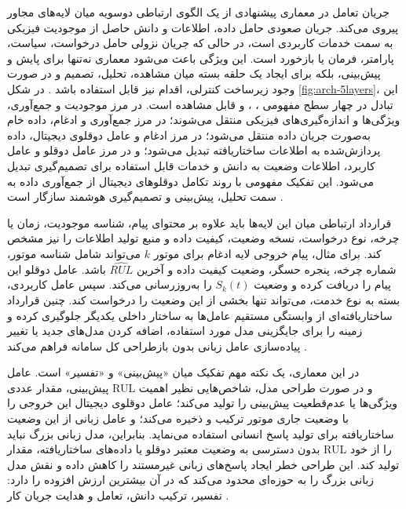 جریان تعامل در معماری پیشنهادی از یک الگوی ارتباطی دوسویه میان لایه‌های مجاور پیروی می‌کند. جریان صعودی حامل داده، اطلاعات و دانش حاصل از موجودیت فیزیکی به سمت خدمات کاربردی است، در حالی که جریان نزولی حامل درخواست، سیاست، پارامتر، فرمان یا بازخورد است. این ویژگی باعث می‌شود معماری نه‌تنها برای پایش و پیش‌بینی، بلکه برای ایجاد یک حلقه بسته میان مشاهده، تحلیل، تصمیم و در صورت وجود زیرساخت کنترلی، اقدام نیز قابل استفاده باشد \cite{tao2019digital,qi2021enabling}. در شکل \ref{fig:arch-5layers}، این تبادل در چهار سطح مفهومی ، ،  و  قابل مشاهده است. در مرز موجودیت و جمع‌آوری، ویژگی‌ها و اندازه‌گیری‌های فیزیکی منتقل می‌شوند؛ در مرز جمع‌آوری و ادغام، داده خام به‌صورت جریان داده منتقل می‌شود؛ در مرز ادغام و عامل دوقلوی دیجیتال، داده پردازش‌شده به اطلاعات ساختاریافته تبدیل می‌شود؛ و در مرز عامل دوقلو و عامل کاربرد، اطلاعات وضعیت به دانش و خدمات قابل استفاده برای تصمیم‌گیری تبدیل می‌شود. این تفکیک مفهومی با روند تکامل دوقلو‌های دیجیتال از جمع‌آوری داده به سمت تحلیل، پیش‌بینی و تصمیم‌گیری هوشمند سازگار است \cite{fuller2020digital,zhou2026dtai,fu2026genaidt}.

قرارداد ارتباطی میان این لایه‌ها باید علاوه بر محتوای پیام، شناسه موجودیت، زمان یا چرخه، نوع درخواست، نسخه وضعیت، کیفیت داده و منبع تولید اطلاعات را نیز مشخص کند. برای مثال، پیام خروجی لایه ادغام برای موتور $k$ می‌تواند شامل شناسه موتور، شماره چرخه، پنجره حسگر، وضعیت کیفیت داده و آخرین $\widehat{RUL}$ باشد. عامل دوقلو این پیام را دریافت کرده و وضعیت $S_k(t)$ را به‌روزرسانی می‌کند. سپس عامل کاربردی، بسته به نوع خدمت، می‌تواند تنها بخشی از این وضعیت را درخواست کند. چنین قرارداد ساختاریافته‌ای از وابستگی مستقیم عامل‌ها به ساختار داخلی یکدیگر جلوگیری کرده و زمینه را برای جایگزینی مدل مورد استفاده، اضافه کردن مدل‌های جدید یا تغییر پیاده‌سازی عامل زبانی بدون بازطراحی کل سامانه فراهم می‌کند \cite{park2026hybriddt}.

در این معماری، یک نکته مهم تفکیک میان «پیش‌بینی» و «تفسیر» است. عامل پیش‌بینی، مقدار عددی \gls{RUL} و در صورت طراحی مدل، شاخص‌هایی نظیر اهمیت ویژگی‌ها یا عدم‌قطعیت پیش‌بینی را تولید می‌کند؛ عامل دوقلوی دیجیتال این خروجی را با وضعیت جاری موتور ترکیب و ذخیره می‌کند؛ و عامل زبانی از این وضعیت ساختاریافته برای تولید پاسخ انسانی استفاده می‌نماید. بنابراین، مدل زبانی بزرگ نباید بدون دسترسی به وضعیت معتبر دوقلو یا داده‌های ساختاریافته، مقدار \gls{RUL} را از خود تولید کند. این طراحی خطر ایجاد پاسخ‌های زبانی غیرمستند را کاهش داده و نقش مدل زبانی بزرگ را به حوزه‌ای محدود می‌کند که در آن بیشترین ارزش افزوده را دارد: تفسیر، ترکیب دانش، تعامل و هدایت جریان کار \cite{zhou2026dtai}.


